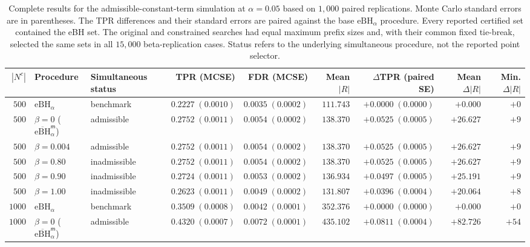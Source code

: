 \begin{table}[t]
\centering
\caption{Complete results for the admissible-constant-term simulation at $\alpha=0.05$ based on $1{,}000$ paired replications. Monte Carlo standard errors are in parentheses.  The TPR differences and their standard errors are paired against the base $\mathrm{eBH}_\alpha$ procedure.  Every reported certified set contained the eBH set. The original and constrained searches had equal maximum prefix sizes and, with their common fixed tie-break, selected the same sets in all $15{,}000$ beta-replication cases. Status refers to the underlying simultaneous procedure, not the reported point selector.}
\label{tab:constant-terms-complete}
\scriptsize
\setlength{\tabcolsep}{3pt}
\begin{adjustbox}{max width=\textwidth}
\begin{tabular}{@{}rllrrrrrr@{}}
\toprule
$|N^c|$ & Procedure & Simultaneous status & TPR (MCSE) & FDR (MCSE) & Mean $|R|$ & $\Delta$TPR (paired SE) & Mean $\Delta|R|$ & Min. $\Delta|R|$ \\
\midrule
$500$ & $\mathrm{eBH}_\alpha$ & benchmark & $0.2227\;(0.0010)$ & $0.0035\;(0.0002)$ & $111.743$ & $+0.0000\;(0.0000)$ & $+0.000$ & $+0$ \\
$500$ & $\beta=0$ ($\overline{\mathrm{eBH}}_\alpha^{\mathsf m}$) & admissible & $0.2752\;(0.0011)$ & $0.0054\;(0.0002)$ & $138.370$ & $+0.0525\;(0.0005)$ & $+26.627$ & $+9$ \\
$500$ & $\beta=0.004$ & admissible & $0.2752\;(0.0011)$ & $0.0054\;(0.0002)$ & $138.370$ & $+0.0525\;(0.0005)$ & $+26.627$ & $+9$ \\
$500$ & $\beta=0.80$ & inadmissible & $0.2752\;(0.0011)$ & $0.0054\;(0.0002)$ & $138.370$ & $+0.0525\;(0.0005)$ & $+26.627$ & $+9$ \\
$500$ & $\beta=0.90$ & inadmissible & $0.2724\;(0.0011)$ & $0.0053\;(0.0002)$ & $136.934$ & $+0.0497\;(0.0005)$ & $+25.191$ & $+9$ \\
$500$ & $\beta=1.00$ & inadmissible & $0.2623\;(0.0011)$ & $0.0049\;(0.0002)$ & $131.807$ & $+0.0396\;(0.0004)$ & $+20.064$ & $+8$ \\
\addlinespace[3pt]
$1000$ & $\mathrm{eBH}_\alpha$ & benchmark & $0.3509\;(0.0008)$ & $0.0042\;(0.0001)$ & $352.376$ & $+0.0000\;(0.0000)$ & $+0.000$ & $+0$ \\
$1000$ & $\beta=0$ ($\overline{\mathrm{eBH}}_\alpha^{\mathsf m}$) & admissible & $0.4320\;(0.0007)$ & $0.0072\;(0.0001)$ & $435.102$ & $+0.0811\;(0.0004)$ & $+82.726$ & $+54$ \\

\end{tabular}
\end{adjustbox}
\end{table}

